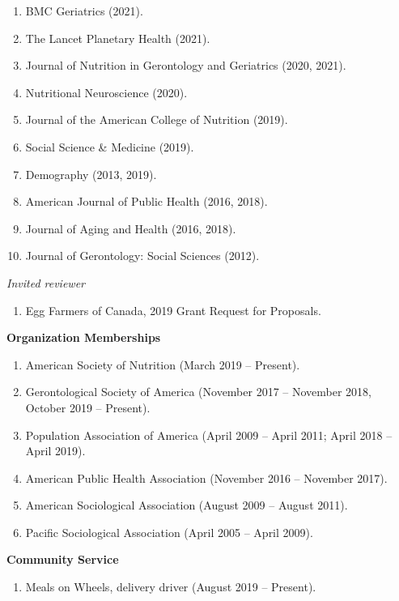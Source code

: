 \documentclass[
]{article}
\providecommand{\tightlist}{%
  \setlength{\itemsep}{0pt}\setlength{\parskip}{0pt}}
\begin{document}
\begin{enumerate}
\def\labelenumi{\arabic{enumi}.}
\item
  BMC Geriatrics (2021).
\item
  The Lancet Planetary Health (2021).
\item
  Journal of Nutrition in Gerontology and Geriatrics (2020, 2021).
\item
  Nutritional Neuroscience (2020).
\item
  Journal of the American College of Nutrition (2019).
\item
  Social Science \& Medicine (2019).
\item
  Demography (2013, 2019).
\item
  American Journal of Public Health (2016, 2018).
\item
  Journal of Aging and Health (2016, 2018).
\item
  Journal of Gerontology: Social Sciences (2012).
\end{enumerate}

\emph{Invited reviewer}

\begin{enumerate}
\def\labelenumi{\arabic{enumi}.}
\tightlist
\item
  Egg Farmers of Canada, 2019 Grant Request for Proposals.
\end{enumerate}

\textbf{Organization Memberships}

\begin{enumerate}
\def\labelenumi{\arabic{enumi}.}
\item
  American Society of Nutrition (March 2019 -- Present).
\item
  Gerontological Society of America (November 2017 -- November 2018,
  October 2019 -- Present).
\item
  Population Association of America (April 2009 -- April 2011; April
  2018 -- April 2019).
\item
  American Public Health Association (November 2016 -- November 2017).
\item
  American Sociological Association (August 2009 -- August 2011).
\item
  Pacific Sociological Association (April 2005 -- April 2009).
\end{enumerate}

\textbf{Community Service}

\begin{enumerate}
\def\labelenumi{\arabic{enumi}.}
\tightlist
\item
  Meals on Wheels, delivery driver (August 2019 -- Present).
\end{enumerate}
\end{document}
